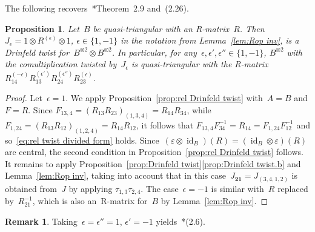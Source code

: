 \documentclass[12pt, reqno]{amsart}
\newtheorem{proposition}[theorem]{Proposition}
\theoremstyle{definition}
\newtheorem{remark}[theorem]{Remark}
\numberwithin{equation}{section}
\newcommand{\tensor}{\otimes}
\DeclareMathOperator{\id}{id}
\begin{document}
The following recovers~\cite{RSTS}*{Theorem~2.9 and~(2.26)}.
\begin{proposition}\label{prop:basic twist}
Let~$B$ be quasi-triangular with an R-matrix~$R$. Then 
$J_{\epsilon}=1\tensor R^{(\epsilon)}\tensor 1$, $\epsilon\in\{1,-1\}$ in
the notation from Lemma~\ref{lem:Rop inv}, is a Drinfeld twist for~$B^{\tensor 2}\tensor B^{\tensor 2}$. In particular, for any~$\epsilon,\epsilon',\epsilon''\in\{1,-1\}$,
$B^{\tensor 2}$
with the comultiplication twisted by~$J_\epsilon$ is quasi-triangular
with the R-matrix $R_{14}^{(-\epsilon)}R_{13}^{(\epsilon')} R_{24}^{(\epsilon'')} R_{23}^{(\epsilon)}$.
\end{proposition}
\begin{proof}
Let~$\epsilon=1$.
We apply Proposition~\ref{prop:rel Drinfeld twist} with~$A=B$ and $F=R$. Since
$F_{13,4}=(R_{13}R_{23})_{(1,3,4)}=R_{14}R_{34}$, while $F_{1,24}=
(R_{13}R_{12})_{(1,2,4)}=R_{14}R_{12}$,  
it follows that
$F_{13,4}F_{34}^{-1}=R_{14}=F_{1,24}F_{12}^{-1}$
and so~\eqref{eq:rel twist divided form} holds. 
Since~$(\varepsilon\tensor\id_B)(R)=(\id_B\tensor \varepsilon)(R)$ are central, the second condition in Proposition~\ref{prop:rel Drinfeld twist} follows. It remains to apply Proposition~\ref{prop:Drinfeld twist}\ref{prop:Drinfeld twist.b} and Lemma~\ref{lem:Rop inv},
taking into account that in this case~$J_{\mathbf{21}}=J_{(3,4,1,2)}$ is obtained from~$J$ by 
applying $\tau_{1,3}\tau_{2,4}$. The case~$\epsilon=-1$ is similar with~$R$ replaced
by~$R_{21}^{-1}$, which is also an~R-matrix for~$B$ by Lemma~\ref{lem:Rop inv}.
\end{proof}
\begin{remark}
Taking~$\epsilon=\epsilon''=1$, $\epsilon'=-1$ yields~\cite{RSTS}*{(2.6)}.
\end{remark}
\end{document}
